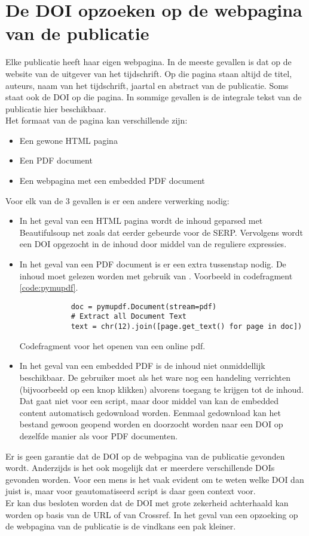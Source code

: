\section{De DOI opzoeken op de webpagina van de publicatie}
Elke publicatie heeft haar eigen webpagina. In de meeste gevallen is dat op de website van de uitgever van het tijdschrift. Op die pagina staan altijd de titel, auteurs, naam van het tijdschrift, jaartal en abstract van de publicatie.
Soms staat ook de DOI op die pagina.
In sommige gevallen is de integrale tekst van de publicatie hier beschikbaar.\\
Het formaat van de pagina kan verschillende zijn:
\begin{itemize}
    \item Een gewone HTML pagina
    \item Een PDF document
    \item Een webpagina met een embedded PDF document
\end{itemize}
Voor elk van de 3 gevallen is er een andere verwerking nodig:
\begin{itemize}
    \item In het geval van een HTML pagina wordt de inhoud geparsed met Beautifulsoup net zoals dat eerder gebeurde voor de SERP. Vervolgens wordt een DOI opgezocht in de inhoud door middel van de reguliere expressies.
    \item In het geval van een PDF document is er een extra tussenstap nodig. De inhoud moet gelezen worden met gebruik van \autocite{Pymupdf2025}. Voorbeeld in codefragment \ref{code:pymupdf}.
    \begin{listing}
        \begin{verbatim}
            doc = pymupdf.Document(stream=pdf)
            # Extract all Document Text
            text = chr(12).join([page.get_text() for page in doc])
        \end{verbatim}
        \caption[Pymupdf codefragment]{Codefragment voor het openen van een online pdf.}
        \label{code:pymupdf}
    \end{listing}
    \item In het geval van een embedded PDF is de inhoud niet onmiddellijk beschikbaar. De gebruiker moet als het ware nog een handeling verrichten (bijvoorbeeld op een knop klikken) alvorens toegang te krijgen tot de inhoud. Dat gaat niet voor een script, maar door middel van \autocite{Selenium2025} kan de embedded content automatisch gedownload worden. Eenmaal gedownload kan het bestand gewoon geopend worden en doorzocht worden naar een DOI op dezelfde manier als voor PDF documenten.
\end{itemize}
Er is geen garantie dat de DOI op de webpagina van de publicatie gevonden wordt. Anderzijds is het ook mogelijk dat er meerdere verschillende DOIs gevonden worden. Voor een mens is het vaak evident om te weten welke DOI dan juist is, maar voor geautomatiseerd script is daar geen context voor.\\
Er kan dus besloten worden dat de DOI met grote zekerheid achterhaald kan worden op basis van de URL of van Crossref. In het geval van een opzoeking op de webpagina van de publicatie is de vindkans een pak kleiner.

